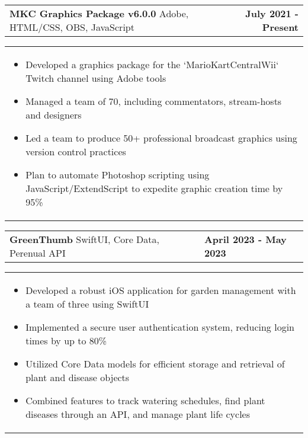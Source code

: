 \documentclass[10pt]{article}
\begin{document}
\vspace{-5pt}

\noindent \begin{tabularx}{\textwidth}{X r}
\textbf{MKC Graphics Package v6.0.0} \textbar{} Adobe, HTML/CSS, OBS, JavaScript & \textbf{July 2021 - Present} \\
\end{tabularx}

\vspace{-5pt}

\noindent \begin{tabularx}{\textwidth}{X}
\begin{itemize}[leftmargin=0.75cm, noitemsep, topsep=0pt, parsep=0pt, partopsep=0pt]
\item Developed a graphics package for the `MarioKartCentralWii` Twitch channel using Adobe tools
\item Managed a team of 70, including commentators, stream-hosts and designers
\item Led a team to produce 50+ professional broadcast graphics using version control practices
\item Plan to automate Photoshop scripting using JavaScript/ExtendScript to expedite graphic creation time by 95\%
\end{itemize}
\end{tabularx}

\vspace{-5pt}


\noindent \begin{tabularx}{\textwidth}{X >{\raggedleft\arraybackslash}X}
\textbf{GreenThumb} \textbar{} SwiftUI, Core Data, Perenual API & \textbf{April 2023 - May 2023} \\
\end{tabularx}

\vspace{-5pt}

\noindent \begin{tabularx}{\textwidth}{X}
\begin{itemize}[leftmargin=0.75cm, noitemsep, topsep=0pt, parsep=0pt, partopsep=0pt]
\item Developed a robust iOS application for garden management with a team of three using SwiftUI
\item Implemented a secure user authentication system, reducing login times by up to 80\%
\item Utilized Core Data models for efficient storage and retrieval of plant and disease objects
\item Combined features to track watering schedules, find plant diseases through an API, and manage plant life cycles
\end{itemize}
\end{tabularx}
\end{document}
